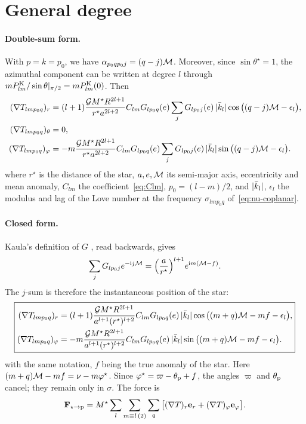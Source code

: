 \section{General degree}
\paragraph{Double-sum form.} With $p=k=p_0$, we have $\alpha_{p_0qp_0j}=(q-j)\mathcal{M}$. Moreover, since $\sin\theta^\star=1$, the azimuthal component can be written at degree $l$ through $mP^{\mathrm K}_{lm}/\sin\theta|_{\pi/2}=mP^{\mathrm K}_{lm}(0)$. Then
\begin{equation}
  \begin{aligned}
  (\nabla T_{lmp_0q})_r&=(l+1)\frac{\mathcal{G} M^\star R^{2l+1}}{r^\star a^{2l+2}}C_{lm}G_{lp_0q}(e)\sum_jG_{lp_0j}(e)\,|\bar k_l|\cos\big((q-j)\mathcal{M}-\epsilon_l\big),\\
  (\nabla T_{lmp_0q})_\theta&=0,\\
  (\nabla T_{lmp_0q})_\varphi&=-m\frac{\mathcal{G} M^\star R^{2l+1}}{r^\star a^{2l+2}}C_{lm}G_{lp_0q}(e)\sum_jG_{lp_0j}(e)\,|\bar k_l|\sin\big((q-j)\mathcal{M}-\epsilon_l\big).
  \end{aligned} \label{eq:coplanar-A}
\end{equation}
where $r^\star$ is the distance of the star, $a,e,\mathcal{M}$ its semi-major axis, eccentricity and mean anomaly, $C_{lm}$ the coefficient~\eqref{eq:Clm}, $p_0=(l-m)/2$, and $|\bar k_l|$, $\epsilon_l$ the modulus and lag of the Love number at the frequency $\sigma_{lmp_0q}$ of~\eqref{eq:nu-coplanar}.

\paragraph{Closed form.} Kaula's definition of $G$ \citep[p.~35]{Kaula2000}, read backwards, gives
\[
  \sum_jG_{lp_0j}e^{-\mathrm{i} j\mathcal{M}}=\Big(\frac{a}{r^\star}\Big)^{l+1}e^{\mathrm{i} m(\mathcal{M}-f)}.
\]
The $j$-sum is therefore the instantaneous position of the star:
\begin{equation}
  \boxed{\begin{aligned}
  (\nabla T_{lmp_0q})_r&=(l+1)\frac{\mathcal{G} M^\star R^{2l+1}}{a^{l+1}(r^\star)^{l+2}}C_{lm}G_{lp_0q}(e)\,|\bar k_l|\cos\big((m+q)\mathcal{M}-mf-\epsilon_l\big),\\
  (\nabla T_{lmp_0q})_\varphi&=-m\frac{\mathcal{G} M^\star R^{2l+1}}{a^{l+1}(r^\star)^{l+2}}C_{lm}G_{lp_0q}(e)\,|\bar k_l|\sin\big((m+q)\mathcal{M}-mf-\epsilon_l\big).
  \end{aligned}} \label{eq:coplanar-B}
\end{equation}
with the same notation, $f$ being the true anomaly of the star. Here $(m+q)\mathcal{M}-mf=\nu-m\varphi^\star$. Since $\varphi^\star=\varpi-\theta_{\mathrm p}+f$, the angles $\varpi$ and $\theta_{\mathrm p}$ cancel; they remain only in $\sigma$. The force is
\[
  \mathbf F_{\star\to\mathrm p}=M^\star\sum_{l}\sum_{m\equiv l\,(2)}\sum_q\big[(\nabla T)_r\mathbf e_r+(\nabla T)_\varphi\mathbf e_\varphi\big].
\]

